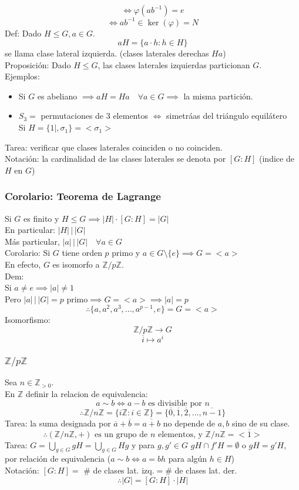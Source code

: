\documentclass[11pt]{book}
\theoremstyle{definition}
\begin{document}
\[
\iff \varphi(ab^{-1})=e
\]
\[
\iff ab^{-1}\in \ker(\varphi)=N
\]
Def: Dado $H\leq G,a \in G$.
\[
aH=\{a\cdot h:h\in H\}
\]
se llama clase lateral izquierda. (clases laterales derechas $Ha$)\\
Proposición: Dado $H\leq G$, las clases laterales izquierdas particionan $G$.\\
Ejemplos:
\begin{itemize}
	\item Si $G$ es abeliano $\implies aH=Ha\quad \forall a\in G\implies$ la misma partición.
	
	\item $S_3=$ permutaciones de $3$ elementos $\iff$ simetrá­as del triángulo equilátero\\
	Si $H=\{1|,\sigma_1\}=<\sigma_1>$
\end{itemize}
Tarea: verificar que clases laterales coinciden o no coinciden.\\
Notación: la cardinalidad de las clases laterales se denota por $\left[G:H\right]$ (indice de $H$ en $G$)\\
\subsubsection{Corolario: Teorema de Lagrange}
Si $G$ es finito y $H\leq G\implies |H|\cdot [G:H]=|G|$\\
En particular: $|H|\, |\,|G|$\\
Más particular, $|a| \, |\,|G|\quad \forall a \in G$\\
Corolario: Si $G$ tiene orden $p$ primo y $a\in G\setminus\{e\}\implies G=<a>$\\
En efecto, $G$ es isomorfo a $\mathbb{Z}/p\mathbb{Z}$.\\
Dem:\\
Si $a\neq e\implies |a|\neq 1$\\
Pero $|a|\, |\, |G|=p\textrm{ primo}\implies G=<a>\implies |a|=p$
\[
\therefore \{a,a^2,a^3,...,a^{p-1},e\}=G=<a>
\]
Isomorfismo:
\[
\mathbb{Z}/p\mathbb{Z}\rightarrow G
\]
\[
\overline{i}\mapsto a^i
\]

\subsubsection{$\mathbb{Z}/p\mathbb{Z}$}
Sea $n\in\mathbb{Z}_{>0}$.\\
En $\mathbb{Z}$ definir la relacion de equivalencia:
\[
a\sim b\iff a-b\textrm{ es divisible por } n
\]
\[
\therefore \mathbb{Z}/n\mathbb{Z}=\{i\mathbb{Z}:i\in\mathbb{Z}\}=\{\overline{0},\overline{1},\overline{2},...,\overline{n-1}\}
\]
Tarea: la suma designada por $\overline{a}+\overline{b}=\overline{a+b}$ no depende de $a,b$ sino de su clase.
\[
\therefore (\mathbb{Z}/n\mathbb{Z},+)\textrm{ es un grupo de $n$ elementos, y $\mathbb{Z}/n\mathbb{Z}=<\overline{1}>$}
\]
Tarea: $G=\bigcup_{g\in G}gH=\bigcup_{g\in G}Hg$ y para $g,g'\in G$ $gH\cap f'H=\emptyset$ o $gH=g'H$, por relación de equivalencia ($a\sim b\iff a=bh$ para algún $h\in H$)\\
Notación: $[G:H]=$ \# de clases lat. izq.$=$\# de clases lat. der.
\[
\therefore |G|=[G:H]\cdot |H|
\]
\end{document}
